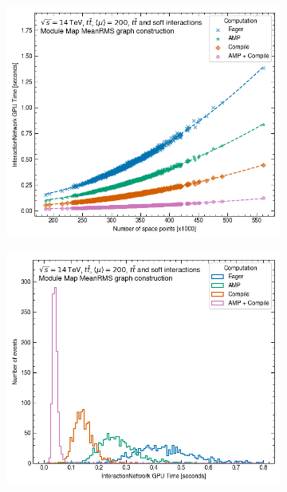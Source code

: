 \begin{figure}[h!]
    \centering
    \begin{subfigure}[b]{0.49\textwidth}
    \centering
        \includegraphics[width=\textwidth]{figures/rms_80g.png}
        \caption{}
        \label{subfig:gnn-time-node}
    \end{subfigure}
    \begin{subfigure}[b]{0.49\textwidth}\centering
        \includegraphics[width=\textwidth]{figures/rms_80g_hist.png}
        \caption{}

\end{subfigure}
\end{figure}
